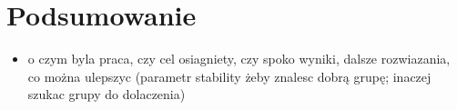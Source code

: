 \documentclass[12pt, twoside, openany]{report}
\begin{document}

\chapter{Podsumowanie}

\begin{itemize}
\item o czym byla praca, czy cel osiagniety, czy spoko wyniki, dalsze rozwiazania, co można ulepszyc (parametr stability żeby znalesc dobrą grupę; inaczej szukac grupy do dolaczenia)
\end{itemize}
\end{document}
